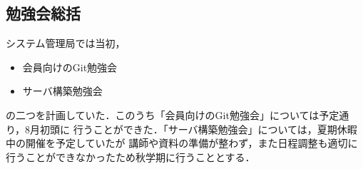 \subsection*{勉強会総括}


システム管理局では当初，

\begin{itemize}
    \item 会員向けのGit勉強会
    \item サーバ構築勉強会
\end{itemize}

の二つを計画していた．このうち「会員向けのGit勉強会」については予定通り，8月初頭に
行うことができた．「サーバ構築勉強会」については，夏期休暇中の開催を予定していたが
講師や資料の準備が整わず，また日程調整も適切に行うことができなかったため秋学期に行うこととする．
